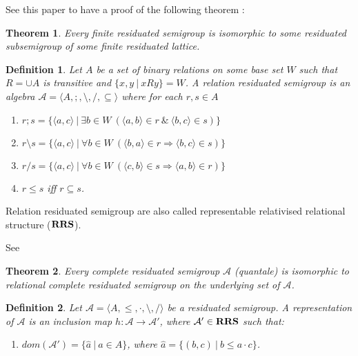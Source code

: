 \documentclass[a4paper]{article}
\theoremstyle{defin}
\newtheorem{defin}{Definition}
\theoremstyle{theorem}
\newtheorem{theorem}{Theorem}
\theoremstyle{prop}
\theoremstyle{lemma}
\theoremstyle{ex}
\theoremstyle{col}
\begin{document}
See this paper to have a proof of the following theorem \cite{goldblatt2006kripke}:

\begin{theorem}
  Every finite residuated semigroup is isomorphic to some residuated subsemigroup of some finite residuated lattice.
\end{theorem}


\begin{defin} \label{rrs}
  Let $A$ be a set of binary relations on some base set $W$ such that $R = \cup A$ is transitive and $\{ x, y \: | \: x R y \} = W$. A relation residuated semigroup is an algebra $\mathcal{A} = \langle A, ;, \setminus, /, \subseteq \rangle$ where for each $r, s \in A$
  \begin{enumerate}
    \item $r ; s = \{ \langle a, c \rangle \: | \: \exists b \in W \: (\langle a, b \rangle \in r \: \& \: \langle b, c \rangle \in s) \}$
    \item $r \setminus s = \{ \langle a, c \rangle \: | \: \forall b \in W \: (\langle b, a \rangle \in r \Rightarrow \langle b, c \rangle \in s)\}$
    \item $r / s = \{ \langle a, c \rangle \: | \: \forall b \in W \: (\langle c, b \rangle \in s \Rightarrow \langle a, b \rangle \in r)\}$
    \item $r \leq s$ iff $r \subseteq s$.
  \end{enumerate}
\end{defin}
Relation residuated semigroup are also called representable relativised relational structure (${\bf RRS}$).

See \cite{brown1993representation}
\begin{theorem}
  Every complete residuated semigroup $\mathcal{A}$ (quantale) is isomorphic to relational complete residuated semigroup on the underlying set of $\mathcal{A}$.
\end{theorem}

\begin{defin}
  Let $\mathcal{A} = \langle A, \leq, \cdot, \setminus, / \rangle$ be a residuated semigroup. A representation of $\mathcal{A}$ is an inclusion map $h : \mathcal{A} \to \mathcal{A}'$,
  where $\mathcal{A}' \in {\bf RRS}$ such that:
  \begin{enumerate}
    \item $dom(\mathcal{A}') = \{ \hat{a} \: | \: a \in A\}$, where $\hat{a} = \{ (b, c) \: | \: b \leq a \cdot c \}$.
  \end{enumerate}
\end{defin}
\end{document}
